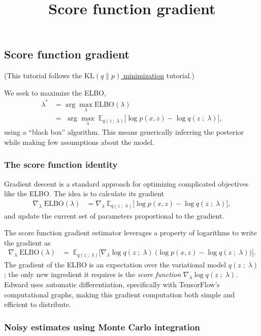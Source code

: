 \title{Score function gradient}

\subsection{Score function gradient}

(This tutorial follows the
\href{tut_KLqp}{$\text{KL}(q\|p)$ minimization} tutorial.)

We seek to maximize the ELBO,
\begin{align*}
  \lambda^*
  &=
  \arg \max_\lambda \text{ELBO}(\lambda)\\
  &=\;
  \arg \max_\lambda\;
  \mathbb{E}_{q(z\;;\;\lambda)}
  \big[
  \log p(x, z)
  -
  \log q(z\;;\;\lambda)
  \big],
\end{align*}
using a ``black box'' algorithm. This means generically inferring the
posterior while making few assumptions about the model.

\subsubsection{The score function identity}

Gradient descent is a standard approach for optimizing complicated
objectives like the ELBO. The idea is to calculate its gradient
\begin{align*}
  \nabla_\lambda\;
  \text{ELBO}(\lambda)
  &=
  \nabla_\lambda\;
  \mathbb{E}_{q(z\;;\;\lambda)}
  \big[
  \log p(x, z)
  -
  \log q(z\;;\;\lambda)
  \big],
\end{align*}
and update the current set of parameters proportional to the gradient.

The score function gradient estimator leverages a property of
logarithms to write the gradient as
\begin{align*}
  \nabla_\lambda\;
  \text{ELBO}(\lambda)
  &=\;
  \mathbb{E}_{q(z\;;\;\lambda)}
  \big[
  \nabla_\lambda \log q(z\;;\;\lambda)
  \:
  \big(
  \log p(x, z)
  -
  \log q(z\;;\;\lambda)
  \big)
  \big].
\end{align*}
The gradient of the ELBO is an expectation over the variational
model $q(z\;;\;\lambda)$; the only new ingredient it requires is the
\emph{score function} $\nabla_\lambda \log q(z\;;\;\lambda)$.
Edward uses automatic differentiation, specifically with TensorFlow's
computational graphs, making this gradient computation both simple and
efficient to distribute.

\subsubsection{Noisy estimates using Monte Carlo integration}

